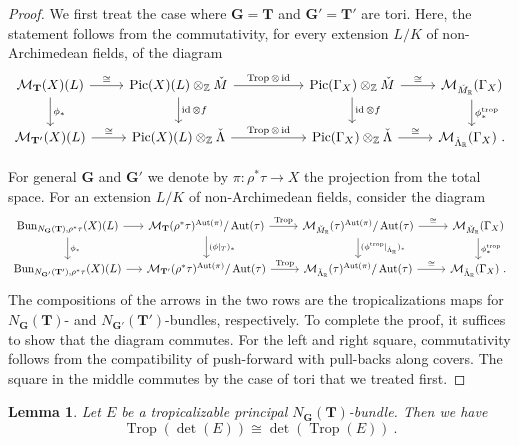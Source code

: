 \documentclass[10pt, a4paper]{amsart}
\newtheorem{lemma}[theorem]{Lemma}
\theoremstyle{definition}
\theoremstyle{myitemstyle}
\newcommand{\R}{\mathbb{R}}
\newcommand{\Z}{\mathbb{Z}}
\newcommand{\Mcheck}{{\check{M}}}
\newcommand{\Lambdacheck}{\check{\Lambda}}
\newcommand{\bfG}{\mathbf{G}}
\newcommand{\bfT}{\mathbf{T}}
\newcommand{\mc}[1]{{\mathcal{#1}}}
\DeclareMathOperator{\Pic}{Pic}
\DeclareMathOperator{\Aut}{Aut}
\DeclareMathOperator{\Trop}{Trop}
\DeclareMathOperator{\id}{id}
\DeclareMathOperator{\Bun}{Bun}
\newcommand{\trop}{{\mathrm{trop}}}
\begin{document}
\begin{proof}
We first treat the case where $\mathbf{G}=\mathbf{T}$ and $\mathbf{G}'=\mathbf{T}'$ are tori. Here, the statement follows from the commutativity, for every extension $L/K$ of non-Archimedean fields, of the diagram
\[
\begin{tikzcd}
\mc M_{\bfT}(X)(L) \arrow[r,"\cong"]\arrow[d,"\phi_*"]
    & \Pic(X)(L)\otimes_\Z \Mcheck    \arrow[r, "\Trop\otimes\id"]\arrow[d,"\id\otimes f"]
        &[1cm] \Pic(\Gamma_X)\otimes_\Z \Mcheck \arrow[r,"\cong"]\arrow[d,"\id\otimes f"] 
            & \mc M_{\Mcheck_\R}(\Gamma_X) \arrow[d, "\phi^\trop_*"]\\
\mc M_{\bfT'}(X)(L)   \arrow[r,"\cong"]
    & \Pic(X)(L)\otimes_\Z \Lambdacheck \arrow[r,"\Trop\otimes\id"]
        & \Pic(\Gamma_X)\otimes_\Z \Lambdacheck \arrow[r,"\cong"]
            & \mc M_{\Lambdacheck_\R}(\Gamma_X) \ .
\end{tikzcd}
\]

For general $\mathbf{G}$ and $\mathbf{G}'$ we denote by $\pi\colon \rho^*\tau \to X$ the projection from the total space. For an extension $L/K$ of non-Archimedean fields, consider the diagram
\[
\begin{tikzcd}
\Bun_{N_\bfG(\bfT),\rho^*\tau}(X)(L) \arrow[d,"\phi_*"]\arrow[r]
    &[-1em]\mc M_{\bfT}(\rho^*\tau)^{\Aut(\pi)}/\Aut(\tau) \arrow[d,"(\phi|_T)_*"]\arrow[r,"\Trop"]
        &\mc M_{\Mcheck_\R}(\tau)^{\Aut(\pi)}/\Aut(\tau)  \arrow[d,"(\phi^\trop|_{\Lambdacheck_\R})_*"] \arrow[r,"\cong"]
            &\mc M_{\Mcheck_\R}(\Gamma_X)  \arrow[d,"\phi^\trop_*"] \\
\Bun_{N_{\bfG'}(\bfT'),\rho^*\tau}(X)(L)\arrow[r]
    &\mc M_{\bfT'}(\rho^*\tau)^{\Aut(\pi)}/\Aut(\tau) \arrow[r,"\Trop"]
        &\mc M_{\Lambdacheck_\R}(\tau)^{\Aut(\pi)}/\Aut(\tau)\arrow[r,"\cong"]
            &\mc M_{\Lambdacheck_\R}(\Gamma_X) \ .
\end{tikzcd}
\]
The compositions of the arrows in the two rows are the tropicalizations maps for $N_\bfG(\bfT)$- and $N_{\mathbf{G}'}(\mathbf{T}')$-bundles, respectively. To complete the proof, it  suffices to show that the diagram commutes. For the left and right square, commutativity follows from the compatibility of push-forward with pull-backs along covers. The square in the middle commutes by the case of tori that we treated first. 
\end{proof}



\begin{lemma}
\label{lem:tropicalization commutes with determinants}
Let $E$ be a tropicalizable principal $N_\bfG(\bfT)$-bundle. Then we have
\[
    \Trop(\det(E))\cong {\det} (\Trop(E)) \ .
\]
\end{lemma}
\end{document}
